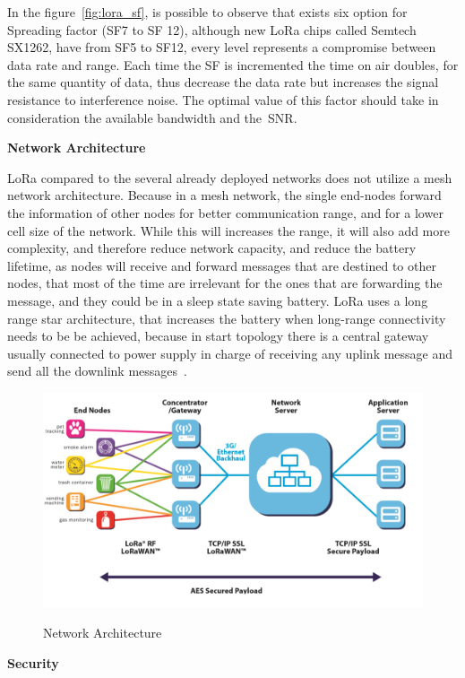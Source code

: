 In the figure~\ref{fig:lora_sf}, is possible to observe that exists six option for Spreading factor (SF7 to SF 12), although new LoRa chips called Semtech SX1262, have from SF5 to SF12, every level represents a compromise between data rate and range. Each time the SF is incremented the time on air doubles, for the same quantity of data, thus decrease the data rate but increases the signal resistance to interference noise. The optimal value of this factor should take in consideration the available bandwidth and the~\gls{SNR}.

\textbf{Network Architecture}

LoRa compared to the several already deployed networks does not utilize a mesh network architecture. Because in a mesh network, the single end-nodes forward the information of other nodes for better communication range, and for a lower cell size of the network. While this will increases the range, it will also add more complexity, and therefore reduce network capacity, and reduce the  battery lifetime, as nodes will receive and forward messages that are destined to other nodes, that most of the time are irrelevant for the ones that are forwarding the message, and they could be in a sleep state saving battery. LoRa uses a long range star architecture, that increases the battery when long-range connectivity needs to be be achieved, because in start topology there is a central gateway usually connected to power supply in charge of receiving any uplink message and send all the downlink messages~\cite{LPLoRaAlliance2018}.
\begin{figure}[htbp]
  \centering
    {\includegraphics[height=2.1 in,width=0.75\linewidth]{Chapters/Figures/loranetwork.PNG}}%
  \caption{Network Architecture~\cite{LPLoRaAlliance2018}}
  \label{fig:lora_network_a}
\end{figure}

\textbf{Security }

